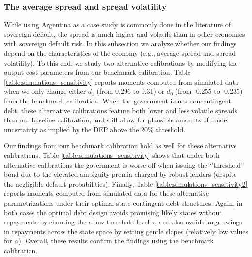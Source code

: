 \subsubsection{The average spread and spread volatility}

While using Argentina as a case study is commonly done in the literature of sovereign default, the spread is much higher and volatile than in other economies with sovereign default risk. In this subsection we analyze whether our findings depend on the characteristics of the economy (e.g., average spread and spread volatility). To this end, we study two alternative calibrations by modifying the output cost parameters from our benchmark calibration. Table \ref{table:simulations_sensitivity} reports moments computed from simulated data when we only change either $d_1$ (from 0.296 to 0.31) or $d_0$ (from -0.255 to -0.235) from the benchmark calibration. When the government issues noncontingent debt, these alternative calibrations feature both lower and less volatile spreads than our baseline calibration, and still allow for plausible amounts of model uncertainty as implied by the DEP above the 20\% threshold.

Our findings from our benchmark calibration hold as well for these alternative calibrations. Table \ref{table:simulations_sensitivity} shows that under both alternative calibrations the government is worse off when issuing the `'threshold'' bond due to the elevated ambiguity premia charged by robust lenders (despite the negligible default probabilities). Finally, Table \ref{table:simulations_sensitivity2} reports moments computed from simulated data for these alternative parametrizations under their optimal state-contingent debt structures. Again, in both cases the optimal debt design avoids promising likely states without repayments by choosing the a low threshold level $\tau$, and also avoids large swings in repayments across the state space by setting gentle slopes (relatively low values for $\alpha$). Overall, these results confirm the findings using the benchmark calibration.



